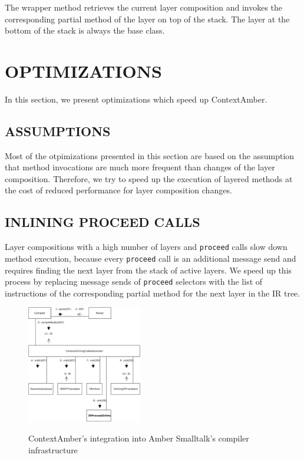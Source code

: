\documentclass[english,paper=a4,twocolumn=true,DIV=calc,fontsize=9pt]{scrartcl}
\begin{document}
The wrapper method retrieves the current layer composition and invokes the corresponding partial method of the layer on top of the stack. The layer at the bottom of the stack is always the base class.

\section{OPTIMIZATIONS}
In this section, we present optimizations which speed up ContextAmber.

\subsection{ASSUMPTIONS}
Most of the otpimizations presented in this section are based on the assumption that method invocations are much more frequent than changes of the layer composition. Therefore, we try to speed up the execution of layered methods at the cost of reduced performance for layer composition changes.

\subsection{INLINING PROCEED CALLS}
Layer compositions with a high number of layers and \texttt{proceed} calls slow down method execution, because every \texttt{proceed} call is an additional message send and requires finding the next layer from the stack of active layers. We speed up this process by replacing message sends of \texttt{proceed} selectors with the list of instructions of the corresponding partial method for the next layer in the IR tree.

\begin{figure}[!htp]
    \centering
    \includegraphics[width=0.45\textwidth]{compiler_inline.pdf}
    \label{fig:comp-inline}
    \caption{ContextAmber's integration into Amber Smalltalk's compiler infrastructure}
\end{figure}
\end{document}
